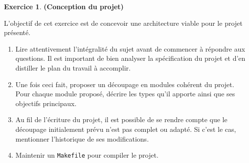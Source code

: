 \documentclass[12pt]{article}
\theoremstyle{definition}
\newtheorem{Exercice}{Exercice}
\begin{document}
\begin{Exercice} {\bf (Conception du projet)}\smallskip

L'objectif de cet exercice est de concevoir une architecture viable pour
le projet présenté.
\begin{enumerate}
    \item Lire attentivement l'intégralité du sujet avant de commencer
    à répondre aux questions. Il est important de bien analyser la 
    spécification du projet et d'en distiller le plan du travail à 
    accomplir.
    \smallskip
    
    \item Une fois ceci fait, proposer un découpage en modules cohérent 
    du projet. Pour chaque module proposé, décrire les types qu'il apporte 
    ainsi que ses objectifs principaux.
    \smallskip
    
    \item Au fil de l'écriture du projet, il est possible de se rendre 
    compte que le 
    découpage initialement prévu n'est pas complet ou adapté. Si c'est 
    le cas, mentionner l'historique de ses modifications.
    \smallskip
    
    \item Maintenir un {\tt Makefile} pour compiler le projet.
\end{enumerate}
\end{Exercice}
\bigskip
\end{document}
